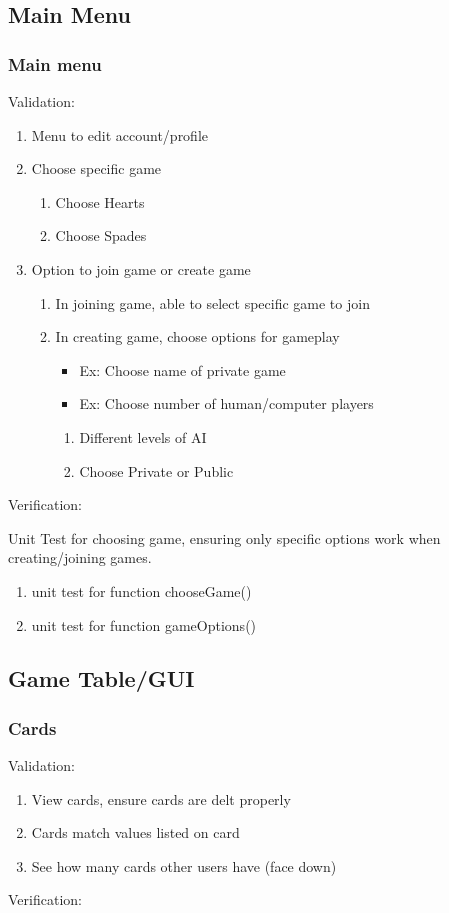 \documentclass[11pt, titlepage]{article}
\begin{document}
		\subsection{Main Menu}
			\subsubsection{Main menu}
			Validation:
				\begin{enumerate}
					\item Menu to edit account/profile
					\item Choose specific game
					\begin{enumerate}
						\item Choose Hearts
						\item Choose Spades
					\end{enumerate}
					\item Option to join game or create game
					\begin{enumerate}
						 \item In joining game, able to select specific game to join
						 \item In creating game, choose options for gameplay
						 	\begin{itemize}
						 		\item Ex: Choose name of private game
								\item Ex: Choose number of human/computer players
						 	\end{itemize}
						 \begin{enumerate}
						 	\item Different levels of AI
							\item Choose Private or Public
						 \end{enumerate}
					\end{enumerate}
				\end{enumerate}
			Verification:

			Unit Test for choosing game, ensuring only specific options work when creating/joining games.
			\begin{enumerate}
				\item unit test for function chooseGame()
				\item unit test for function gameOptions()
			\end{enumerate}
		\subsection{Game Table/GUI}
			\subsubsection{Cards}
			Validation:
			\begin{enumerate}
				\item View  cards, ensure cards are delt properly
				\item Cards match values listed on card
				\item See how many cards other users have (face down)
			\end{enumerate}
			Verification:
\end{document}
